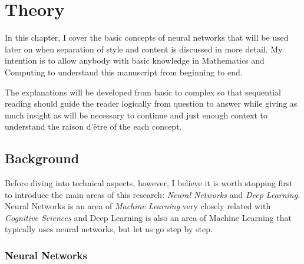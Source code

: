 
\chapter{Theory}
\label{chap:theory}




In this chapter, I cover the basic concepts of neural networks that will be used later on when separation of style and content is discussed in more detail.
My intention is to allow anybody with basic knowledge in Mathematics and Computing to understand this manuscript from beginning to end.

The explanations will be developed from basic to complex so that sequential reading should guide the reader logically from question to answer while giving as much insight as will be necessary to continue and just enough context to understand the raison d'être of the each concept.



\section{Background}
\label{sec:theory:background}

Before diving into technical aspects, however, I believe it is worth stopping first to introduce the main areas of this research: \emph{Neural Networks} and \emph{Deep Learning}.
Neural Networks is an area of \emph{Machine Learning} very closely related with \emph{Cognitive Sciences} and Deep Learning is also an area of Machine Learning that typically uses neural networks, but let us go step by step.


\subsection{Neural Networks}
\label{sub:theory:background:neural-networks}

